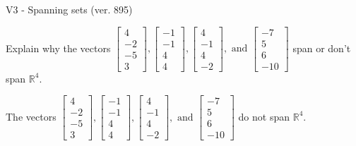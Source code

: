 \begin{exercise}
  \begin{exerciseTitle}V3 - Spanning sets (ver. 895)\end{exerciseTitle}
  \begin{exerciseStatement}
    Explain why the vectors \(\left[\begin{array}{r}
4 \\
-2 \\
-5 \\
3
\end{array}\right] , \left[\begin{array}{r}
-1 \\
-1 \\
4 \\
4
\end{array}\right] , \left[\begin{array}{r}
4 \\
-1 \\
4 \\
-2
\end{array}\right] , \text{ and } \left[\begin{array}{r}
-7 \\
5 \\
6 \\
-10
\end{array}\right]\) span or don't span \(\mathbb{R}^4\). 
	


  \end{exerciseStatement}
  \begin{exerciseAnswer}
   The vectors \(\left[\begin{array}{r}
4 \\
-2 \\
-5 \\
3
\end{array}\right] , \left[\begin{array}{r}
-1 \\
-1 \\
4 \\
4
\end{array}\right] , \left[\begin{array}{r}
4 \\
-1 \\
4 \\
-2
\end{array}\right] , \text{ and } \left[\begin{array}{r}
-7 \\
5 \\
6 \\
-10
\end{array}\right]\) 
  	 do not  
	span \(\mathbb{R}^4\).
  


  \end{exerciseAnswer}
\end{exercise}